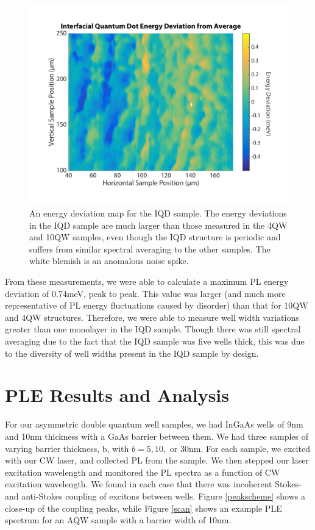 \begin{figure}
\centering
\includegraphics[width = .9\textwidth]{iqd2.pdf}
\caption{ \doublespacing An energy deviation map for the IQD sample. The energy deviations in the IQD sample are much larger than those measured in the 4QW and 10QW samples, even though the IQD structure is periodic and suffers from similar spectral averaging to the other samples. The white blemish is an anomalous noise spike.}
\label{iqdDev}
\end{figure}
\indent From these measurements, we were able to calculate a maximum PL energy deviation of 0.74meV, peak to peak. This value was larger (and much more representative of PL energy fluctuations caused by disorder) than that for 10QW and 4QW structures. Therefore, we were able to measure well width variations greater than one monolayer in the IQD sample. Though there was still spectral averaging due to the fact that the IQD sample was five wells thick, this was due to the diversity of well widths present in the IQD sample by design.


\section{PLE Results and Analysis}
\indent For our asymmetric double quantum well samples, we had InGaAs wells of 9nm and 10nm thickness with a GaAs barrier between them. We had three samples of varying barrier thickness, b, with $b=5,10,$ or $30$nm. For each sample, we excited with our CW laser, and collected PL from the sample. We then stepped our laser excitation wavelength and monitored the PL spectra as a function of CW excitation wavelength. We found in each case that there was incoherent Stokes- and anti-Stokes coupling of excitons between wells. Figure \ref{peakscheme} shows a close-up of the coupling peaks, while Figure \ref{scan} shows an example PLE spectrum for an AQW sample with a barrier width of 10nm. 



